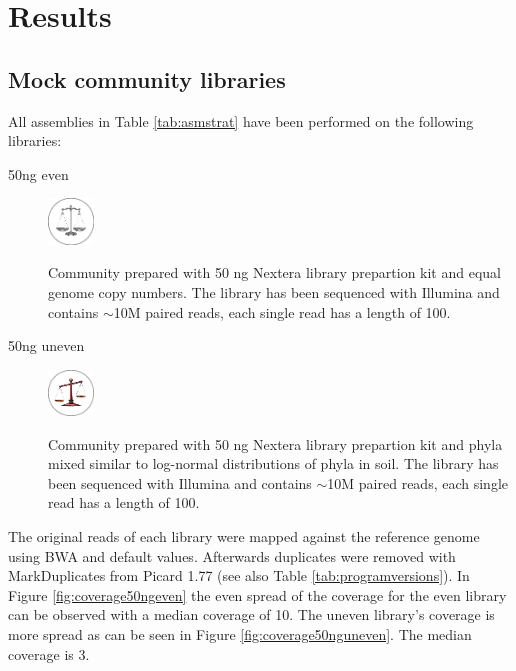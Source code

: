 \documentclass[a4paper,12pt]{report}
\begin{document}
\chapter{Results}

\section{Mock community libraries}
All assemblies in Table \ref{tab:asmstrat} have been performed on the
following libraries:
\begin{description}


\item[50ng even]

    \includegraphics[width=0.1\textwidth]{figures/logos/even.png}

    Community prepared with 50 ng Nextera library prepartion kit and equal
genome copy numbers. The library has been sequenced with Illumina and contains
$\sim$10M paired reads, each single read has a length of 100.



\item[50ng uneven]

    \includegraphics[width=0.1\textwidth]{figures/logos/uneven.png}
    
    Community prepared with 50 ng Nextera library prepartion kit
and phyla mixed similar to log-normal distributions of phyla in soil. The
library has been sequenced with Illumina and contains $\sim$10M paired reads,
each single read has a length of 100.
\end{description}

The original reads of each library were mapped against the reference genome
using BWA \cite{Li20080505} and default values. Afterwards duplicates were
removed with MarkDuplicates from Picard 1.77 (see also Table
\ref{tab:programversions}). In Figure \ref{fig:coverage50ngeven} the even
spread of the coverage for the even library can be observed with a median
coverage of 10. The uneven library's coverage is more spread as can be seen in
Figure \ref{fig:coverage50nguneven}. The median coverage is 3.\\
\end{document}
